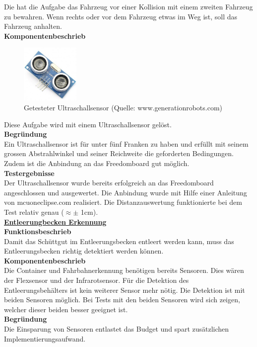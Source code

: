 Die \grqq{} hat die Aufgabe das Fahrzeug vor einer Kollision mit einem zweiten Fahrzeug zu bewahren. Wenn rechts oder vor dem Fahrzeug etwas im Weg ist, soll das Fahrzeug anhalten.\\[0.2cm]
\textbf{Komponentenbeschrieb}\\[0.2cm]
\begin{figure} [H]
	\centering
	\includegraphics[width=0.25\textwidth]{03_Loesungskonzept/pictures/ultraschallsensor.png}
	\caption{Getesteter Ultraschallsensor (Quelle: www.generationrobots.com)}
\end{figure}
Diese Aufgabe wird mit einem Ultraschallsensor gelöst. \\[0.2cm]
\textbf{Begründung}\\[0.2cm]
Ein Ultraschallsensor ist für unter fünf Franken zu haben und erfüllt mit seinem grossen Abstrahlwinkel und seiner Reichweite die geforderten Bedingungen. Zudem ist die Anbindung an das Freedomboard gut möglich.\\[0.2cm]
\textbf{Testergebnisse}\\[0.2cm]
Der Ultraschallsensor wurde bereits erfolgreich an das Freedomboard angeschlossen und  ausgewertet. Die Anbindung wurde mit Hilfe einer Anleitung von mcuoneclipse.com realisiert. Die Distanzauswertung funktionierte bei dem Test relativ genau ($\approx \pm $ 1cm).\\[0.2cm]
%
\underline{\textbf{Entleerungbecken Erkennung}} \\[0.2cm]
\textbf{Funktionsbeschrieb}\\[0.2cm]
Damit das Schüttgut im Entleerungsbecken entleert werden kann, muss das Entleerungsbecken richtig detektiert werden können. \\[0.2cm]
\textbf{Komponentenbeschrieb}\\[0.2cm]
Die Container und Fahrbahnerkennung benötigen bereits Sensoren. Dies wären der Flexsensor und der Infrarotsensor. Für die Detektion des Entleerungsbehälters ist kein weiterer Sensor mehr nötig. Die Detektion ist mit beiden Sensoren möglich. Bei Tests mit den beiden Sensoren wird sich zeigen, welcher dieser beiden besser geeignet ist.\\[0.2cm]
\newpage
\textbf{Begründung}\\[0.2cm]
Die Einsparung von Sensoren entlastet das Budget und spart zusätzlichen Implementierungsaufwand.\\[0.2cm]